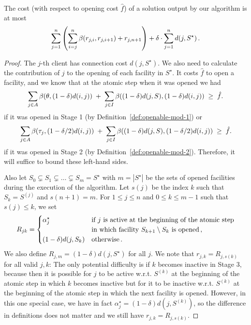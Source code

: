 \begin{lemma}
\label{lemma:alg-cost}
    The cost (with respect to opening cost $\hat{f}$) of a solution output by our algorithm is at most
    \[\sum_{j=1}^n \left(\sum_{i=j}^{n} \beta(r_{j,i}, r_{j,i+1}) + r_{j,n+1}\right) + \delta \cdot \sum_{j=1}^n d(j,S^\star)\,.\]
\end{lemma}
\begin{proof}
    The $j$-th client has connection cost $d(j, S^\star)$.
    We also need to calculate the contribution of $j$ to the opening of each facility in $S^\star$.
    It costs $\hat{f}$ to open a facility, and we know that at the atomic step when it was opened we had
    \[
\sum_{j\in A}\beta(\theta, (1-\delta)d(i,j))
\;+\;
\sum_{j\in I}\beta((1-\delta)d(j,S), (1-\delta)d(i,j))
\;\ge\; \hat f.
\]
    if it was opened in Stage 1 (by Definition~\ref{def:openable-mod-1})
    or 
  \[
      \sum_{j\in A}\beta(\tau_j, (1- \delta/2)d(i,j))
      \;+\;
      \sum_{j\in I}\beta((1-\delta)d(j,S), (1- \delta/2)d(i,j))
      \;\ge\; \hat f.
  \]
  if it was opened in Stage 2 (by Definition~\ref{def:openable-mod-2}).
  Therefore, it will suffice to bound these left-hand sides.
    
    Also let $S_0 \subsetneq S_1 \subsetneq \ldots \subsetneq S_m = S^\star$ with $m = |S^\star|$ be the sets of opened facilities during the execution of the algorithm.
    Let $s(j)$ be the index $k$ such that $S_k = S^{(j)}$ and $s(n+1) = m$.
    For $1 \le j \leq n$ and $0 \leq k \le m - 1$ such that $s(j) \leq k$, we set 
    \[
    R_{jk} =
    \begin{cases}
        \alpha^\star_j &
        \begin{array}[t]{@{}l@{}}
            \text{if $j$ is active at the beginning of the atomic step}\\
            \text{in which facility $S_{k+1}\setminus S_k$ is opened}\,,
        \end{array}
        \\[2mm]
        (1-\delta)d(j,S_k) & \text{otherwise}\,.
    \end{cases}
    \]
    We also define $R_{j,m}= (1-\delta)d(j, S^\star)$ for all $j$.
    We note that $r_{j,k} = R_{j, s(k)}$ for all valid $j,k$: The only potential difficulty is if $k$ becomes inactive in Stage 3, because then it is possible for $j$ to be active w.r.t. $S^{(k)}$ at the beginning of the atomic step in which $k$ becomes inactive but for it to be inactive w.r.t. $S^{(k)}$ at the beginning of the atomic step in which the next facility is opened.
    However, in this one special case, we have in fact $\alpha^\star_j = (1-\delta)d(j,  S^{(k)})$, so the difference in definitions does not matter and we still have $r_{j,k} = R_{j, s(k)}$.


\end{proof}
